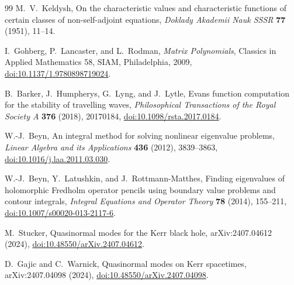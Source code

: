 \documentclass[11pt]{article}
\theoremstyle{remark}
\begin{document}
\begin{thebibliography}{99}
M.~V.~Keldysh,
\newblock On the characteristic values and characteristic functions of
certain classes of non-self-adjoint equations,
\newblock \emph{Doklady Akademii Nauk SSSR} \textbf{77} (1951), 11--14.

I.~Gohberg, P.~Lancaster, and L.~Rodman,
\newblock \emph{Matrix Polynomials},
\newblock Classics in Applied Mathematics 58, SIAM, Philadelphia, 2009,
\newblock \href{https://doi.org/10.1137/1.9780898719024}
{doi:10.1137/1.9780898719024}.

B.~Barker, J.~Humpherys, G.~Lyng, and J.~Lytle,
\newblock Evans function computation for the stability of travelling waves,
\newblock \emph{Philosophical Transactions of the Royal Society A}
\textbf{376} (2018), 20170184,
\newblock \href{https://doi.org/10.1098/rsta.2017.0184}
{doi:10.1098/rsta.2017.0184}.

W.-J.~Beyn,
\newblock An integral method for solving nonlinear eigenvalue problems,
\newblock \emph{Linear Algebra and its Applications} \textbf{436} (2012),
3839--3863,
\newblock \href{https://doi.org/10.1016/j.laa.2011.03.030}
{doi:10.1016/j.laa.2011.03.030}.

W.-J.~Beyn, Y.~Latushkin, and J.~Rottmann-Matthes,
\newblock Finding eigenvalues of holomorphic Fredholm operator pencils using
boundary value problems and contour integrals,
\newblock \emph{Integral Equations and Operator Theory} \textbf{78} (2014),
155--211,
\newblock \href{https://doi.org/10.1007/s00020-013-2117-6}
{doi:10.1007/s00020-013-2117-6}.

M.~Stucker,
\newblock Quasinormal modes for the Kerr black hole,
\newblock arXiv:2407.04612 (2024),
\newblock \href{https://doi.org/10.48550/arXiv.2407.04612}
{doi:10.48550/arXiv.2407.04612}.

D.~Gajic and C.~Warnick,
\newblock Quasinormal modes on Kerr spacetimes,
\newblock arXiv:2407.04098 (2024),
\newblock \href{https://doi.org/10.48550/arXiv.2407.04098}
{doi:10.48550/arXiv.2407.04098}.

\end{thebibliography}
\end{document}
